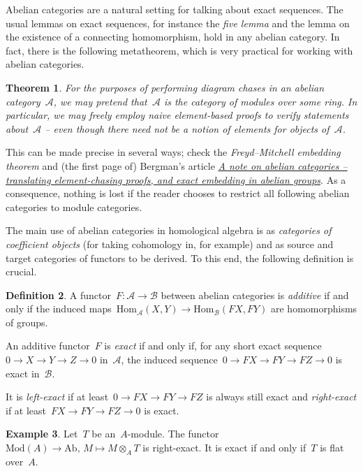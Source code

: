 \documentclass{amsart}
\theoremstyle{definition}
\newtheorem{defn}{Definition}[section]
\newtheorem{ex}[defn]{Example}
\theoremstyle{plain}
\newtheorem{thm}[defn]{Theorem}
\theoremstyle{remark}
\newcommand{\A}{\mathcal{A}}
\newcommand{\B}{\mathcal{B}}
\newcommand{\Hom}{\mathrm{Hom}}
\newcommand{\Ab}{\mathrm{Ab}}
\newcommand{\Mod}{\mathrm{Mod}}
\newcommand{\?}{\,{:}\,}
\renewcommand{\_}{\mathpunct{.}\,}
\begin{document}
Abelian categories are a natural setting for talking about exact sequences. The
usual lemmas on exact sequences, for instance the \emph{five lemma} and the
lemma on the existence of a connecting homomorphism, hold in any abelian
category. In fact, there is the following metatheorem, which is very practical
for working with abelian categories.

\begin{thm}For the purposes of performing diagram chases in an abelian
category~$\A$, we may pretend that~$\A$ is the category of modules over some
ring. In particular, we may freely employ naive element-based proofs to verify
statements about~$\A$ -- even though there need not be a notion of elements for
objects of~$\A$.\end{thm}

This can be made precise in several ways; check the \emph{Freyd--Mitchell
embedding theorem} and (the first page of) Bergman's article
\href{https://math.berkeley.edu/~gbergman/papers/unpub/elem-chase.pdf}{\emph{A
note on abelian categories -- translating element-chasing proofs, and exact
embedding in abelian groups}}. As a consequence, nothing is lost if the reader
chooses to restrict all following abelian categories to module categories.

The main use of abelian categories in homological algebra is as
\emph{categories of coefficient objects} (for taking cohomology in, for
example) and as source and target categories of functors to be derived. To this
end, the following definition is crucial.

\begin{defn}A functor~$F : \A \to \B$ between abelian categories is
\emph{additive} if and only if the induced maps~$\Hom_\A(X,Y) \to
\Hom_\B(FX,FY)$ are homomorphisms of groups.

An additive functor~$F$ is
\emph{exact} if and only if, for any short exact sequence~$0 \to X \to Y \to Z
\to 0$ in~$\A$, the induced sequence~$0 \to FX \to FY \to FZ \to 0$ is exact
in~$\B$.

It is \emph{left-exact} if at least~$0 \to FX \to FY \to FZ$ is always still
exact and \emph{right-exact} if at least~$FX \to FY \to FZ \to 0$ is
exact.\end{defn}

\begin{ex}Let~$T$ be an~$A$-module. The functor~$\Mod(A) \to \Ab,\,M
\mapsto M \otimes_A T$ is right-exact. It is exact if and only if~$T$
is flat over~$A$.\end{ex}
\end{document}
